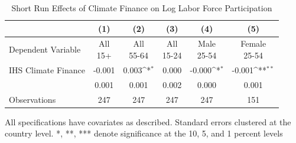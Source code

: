 \begin{table}[htbp]\centering
\def\sym#1{\ifmmode^{#1}\else\(^{#1}\)\fi}
\caption{Short Run Effects of Climate Finance on Log Labor Force Participation}
\begin{tabular}{l*{5}{c}}
\toprule
&\multicolumn{1}{c}{(1)}   &\multicolumn{1}{c}{(2)}   &\multicolumn{1}{c}{(3)}   &\multicolumn{1}{c}{(4)} & \multicolumn{1}{c}{(5)}   \\ \midrule Dependent Variable & \shortstack{All \\ 15+} & \shortstack{All \\ 55-64} & \shortstack{All \\ 15-24} & \shortstack{Male \\ 25-54} & \shortstack{Female \\ 25-54} \\ \midrule
IHS Climate Finance&      -0.001         &       0.003\sym{*}  &       0.000         &      -0.000\sym{*}  &      -0.001\sym{**} \\
            &       0.001         &       0.001         &       0.002         &       0.000         &       0.001         \\
\midrule
Observations&         247         &         247         &         247         &         247         &         151         \\
\bottomrule \end{tabular} \begin{center} \begin{minipage}{0.7\textwidth} \footnotesize\footnotesize  \centering All specifications have covariates as described. Standard errors clustered at the country level. *, **, *** denote significance at the 10, 5, and 1 percent levels \end{minipage} \end{center} \end{table}

